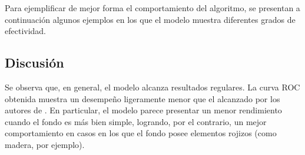 \documentclass[12pt]{article}
\begin{document}
Para ejemplificar de mejor forma el comportamiento del algoritmo, se presentan a
continuación algunos ejemplos en los que el modelo muestra diferentes grados de
efectividad.
\begin{comment}
\begin{figure}[H]
    \centering
   \hfill\subcaptionbox{Imagen original}{\texttt{[image: ../images/nonbin/05.png]}}
   \hfill\subcaptionbox{\emph{GroundTruth}.}{\texttt{[image: ../images/bin/05.png]}}
   \hfill\subcaptionbox{Output de \emph{Mixture of Gaussians} con $\Theta = 0.5$.}{\texttt{[image: ../done0.5/05.png]}}
   \hfill\subcaptionbox{Output de \emph{MoG} con $\Theta = 0.9$.}{\texttt{[image: ../done0.9/05.png]}}
   \caption{Imagen para la cual el modelo presenta un buen comportamiento}
\end{figure}

\begin{figure}[H]
    \centering
   \hfill\subcaptionbox{Imagen
   original}{\texttt{[image: ../images/nonbin/17.png]}}
   \hfill\subcaptionbox{\emph{GroundTruth}.}{\texttt{[image: ../images/bin/17.png]}}
   \hfill\subcaptionbox{Output de \emph{Mixture of Gaussians} con $\Theta =
   0.5$.}{\texttt{[image: ../done0.5/17.png]}}
   \hfill\subcaptionbox{Output de \emph{MoG} con $\Theta =
   0.9$.}{\texttt{[image: ../done0.9/17.png]}}
   \caption{Imagen para la cual el modelo presenta un comportamiento regular}
\end{figure}

\begin{figure}[H]
    \centering
   \hfill\subcaptionbox{Imagen
   original}{\texttt{[image: ../images/nonbin/09.png]}}
   \hfill\subcaptionbox{\emph{GroundTruth}.}{\texttt{[image: ../images/bin/09.png]}}
   \hfill\subcaptionbox{Output de \emph{Mixture of Gaussians} con $\Theta =
   0.5$.}{\texttt{[image: ../done0.5/09.png]}}
   \hfill\subcaptionbox{Output de \emph{MoG} con $\Theta =
   0.9$.}{\texttt{[image: ../done0.9/09.png]}}
   \caption{Imagen para la cual el modelo presenta un mal comportamiento}
\end{figure}
\end{comment}
\subsection{Discusión}

Se observa que, en general, el modelo alcanza resultados regulares. La curva ROC
obtenida muestra un desempeño ligeramente menor que el alcanzado por los autores
de \cite{skin}. En particular, el modelo parece presentar un menor rendimiento
cuando el fondo es más bien simple, logrando, por el contrario, un mejor
comportamiento en casos en los que el fondo posee elementos rojizos (como
madera, por ejemplo). 
\end{document}
